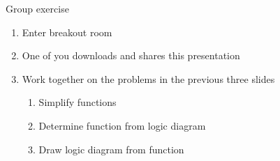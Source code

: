 \documentclass[presentation,aspectratio=1610]{beamer}
\begin{document}
\begin{frame}[label={sec:org98e40c3}]{Group exercise}
\begin{enumerate}
\item Enter breakout room
\item One of you downloads and shares this presentation
\item Work together on the problems in the previous three slides
\begin{enumerate}
\item Simplify functions
\item Determine function from logic diagram
\item Draw logic diagram from function
\end{enumerate}
\end{enumerate}
\end{frame}
\end{document}
